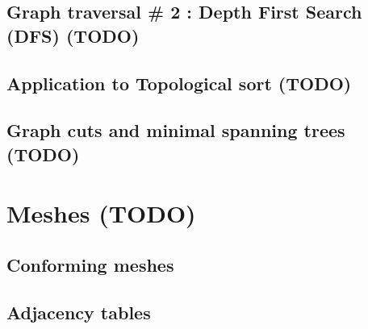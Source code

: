 \documentclass[12pt]{article}
\theoremstyle{plain}
\theoremstyle{remark}
\begin{document}
\subsection{Graph traversal \# 2 : Depth First Search (DFS) (TODO)}

\subsection{Application to Topological sort (TODO)}

\subsection{Graph cuts and minimal spanning trees (TODO)}





\pagebreak
\section{Meshes (TODO)}

\subsection{Conforming meshes}

\subsection{Adjacency tables}
\end{document}
